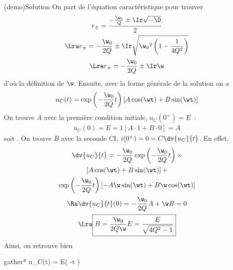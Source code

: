 \documentclass[../../main/main.tex]{subfiles}
\begin{document}
\begin{tcb}[label=demo:solupseudoper, sidebyside](demo){Solution}
	On part de l'équation caractéristique pour trouver
	\begin{gather*}
		r_\pm = \frac{-\frac{\w_0}{Q} \pm \Ir\sqrt{-\D}}{2}\\
		\Lra r_\pm = - \frac{\w_0}{2Q} \pm \Ir \sqrt{\w_0{}^2 \left( 1 -
			\frac{1}{4Q^2} \right)}\\
		\Lra r_\pm = - \frac{\w_0}{2Q} \pm \Ir\w
	\end{gather*}
	d'où la définition de $\w$. Ensuite, avec la forme générale de la
	solution on a
	\begin{equation*}
		u_C(t) = \exp \left(-\frac{\w_0}{2Q}t\right)
		\left[ A\cos(\wt) + B\sin(\wt) \right]
	\end{equation*}
	On trouve $A$ avec la première condition initiale, $u_C(0^+) = E$~:
	\begin{gather*}
		u_C(0) = E = 1 \left[ A \cdot 1 + B \cdot 0 \right] = A
	\end{gather*}
	soit .
	\tcblower
	On trouve $B$ avec la seconde CI, $i(0^+) = 0 = C\dv{u_C}{t}$. En effet,
	\begin{gather*}
		\dv{u_C}{t} = -\frac{\w_0}{2Q}\exp \left( -\frac{\w_0}{2Q}t \right)\times\\
		\left[ A\cos(\wt) + B\sin(\wt) \right] + \\
		\exp \left(
		-\frac{\w_0}{2Q}t \right)
		\left[ -A\w\sin(\wt) + B\w\cos(\wt) \right]\\
		\Ra \dv{u_C}{t} (0) = - \frac{\w_0}{2Q}A + \w B = 0\\
		\Lra \boxed{B = \frac{\w_0}{2Q\w}E =
			\frac{E}{\sqrt{4Q^2-1}}}
	\end{gather*}
	Ainsi, on retrouve bien
	\begin{empheq}[box=\fbox]{gather*}
		u_C(t) = E\exp \left( -t \right)\times\\
	\end{empheq}
\end{tcb}
\end{document}
